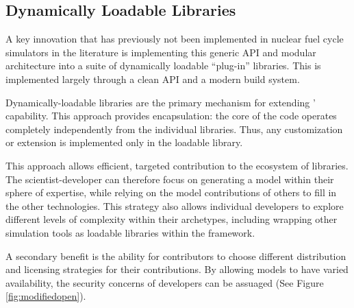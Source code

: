 \subsection{Dynamically Loadable Libraries}

A key innovation that has previously not been implemented in nuclear fuel cycle 
simulators in the literature is implementing this generic API and modular 
architecture into a suite of dynamically loadable ``plug-in'' libraries. 
This is implemented largely through a clean API and a modern build system.

Dynamically-loadable libraries are the primary mechanism for extending \Cyclus' capability. 
This approach provides encapsulation: the core of the code operates
completely independently from the individual libraries. Thus, any
customization or extension is implemented only in the loadable
library. 

This approach allows efficient, targeted contribution to the ecosystem of libraries.  The 
scientist-developer can therefore focus on generating a model within their 
sphere of expertise, while relying on the model contributions of others to fill 
in the other technologies.  This strategy also allows individual developers to
explore different levels of complexity within their archetypes, including
wrapping other simulation tools as loadable libraries within the \Cyclus
framework.

A secondary benefit is the ability for
contributors to choose different distribution and licensing strategies
for their contributions. By allowing models to have varied
availability, the security concerns of developers can be
assuaged (See Figure \ref{fig:modifiedopen}).

